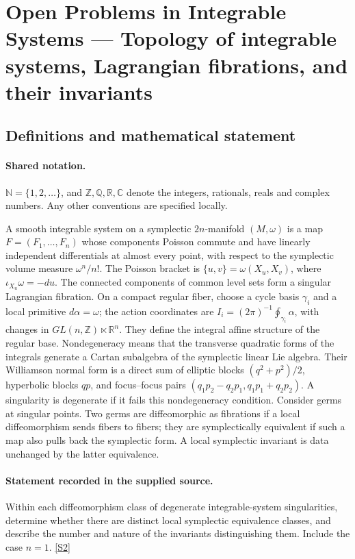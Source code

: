\documentclass[11pt]{article}
\newcommand{\sref}[2]{\hyperlink{source:#1:#2}{[S#2]}}
\begin{document}
\section{Open Problems in Integrable Systems — Topology of integrable systems, Lagrangian fibrations, and their invariants}\label{statement}

\subsection{Definitions and mathematical statement}

\paragraph{Shared notation.}$\mathbb N=\{1,2,\ldots\}$, and $\mathbb Z,\mathbb Q,\mathbb R,\mathbb C$ denote the integers, rationals, reals and complex numbers. Any other conventions are specified locally.


A smooth integrable system on a symplectic $2n$-manifold $(M,\omega)$ is a map $F=(F_1,\ldots,F_n)$ whose components Poisson commute and have linearly independent differentials at almost every point, with respect to the symplectic volume measure $\omega^n/n!$. The Poisson bracket is $\{u,v\}=\omega(X_u,X_v)$, where $\iota_{X_u}\omega=-du$. The connected components of common level sets form a singular Lagrangian fibration. On a compact regular fiber, choose a cycle basis $\gamma_i$ and a local primitive $d\alpha=\omega$; the action coordinates are $I_i=(2\pi)^{-1}\oint_{\gamma_i}\alpha$, with changes in $GL(n,\mathbb Z)\ltimes\mathbb R^n$. They define the integral affine structure of the regular base. Nondegeneracy means that the transverse quadratic forms of the integrals generate a Cartan subalgebra of the symplectic linear Lie algebra. Their Williamson normal form is a direct sum of elliptic blocks $(q^2+p^2)/2$, hyperbolic blocks $qp$, and focus--focus pairs $(q_1p_2-q_2p_1,q_1p_1+q_2p_2)$. A singularity is degenerate if it fails this nondegeneracy condition. Consider germs at singular points. Two germs are diffeomorphic as fibrations if a local diffeomorphism sends fibers to fibers; they are symplectically equivalent if such a map also pulls back the symplectic form. A local symplectic invariant is data unchanged by the latter equivalence.
\paragraph{Statement recorded in the supplied source.}
Within each diffeomorphism class of degenerate integrable-system singularities, determine whether there are distinct local symplectic equivalence classes, and describe the number and nature of the invariants distinguishing them. Include the case $n=1$. \sref{statement}{2}
\end{document}
